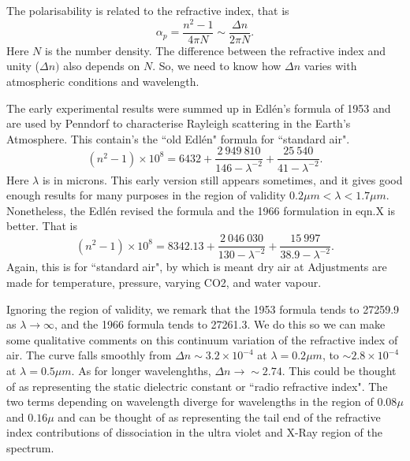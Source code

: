 \documentclass[12pt]{article}
\begin{document}
The polarisability is related to the
refractive index, that is
\begin{equation}
\alpha_p=\frac{n^2-1}{ 4 \pi N} \sim \frac{\Delta n}{2 \pi N}.
\end{equation}
Here $N$ is the number density. The difference between the refractive index and unity ($\Delta n)$ also
depends on $N$. So, we need to know how $\Delta n$ varies with atmospheric conditions and wavelength.

The early experimental results were summed up in Edl\'{e}n's formula of 1953
\cite{Edlen1:Mybib} and are used by Penndorf \cite{PenndorfAir:Mybib} to characterise Rayleigh scattering in the
Earth's Atmosphere. This contain's the ``old Edl\'{e}n" formula for ``standard air".
\begin{equation}
(n^2-1)\times 10^8=6432+\frac{2\>949\>810}{146-\lambda^{-2}}+\frac{25\>540}{41-\lambda^{-2}}.
\end{equation}
Here $\lambda$ is in microns.
This early version still appears sometimes, and it gives good enough results for many purposes
 in the region of validity $0.2 \mu m < \lambda < 1.7 \mu m$. Nonetheless, the Edl\'{e}n revised the
formula \cite{Edlen2:Mybib} and the 1966 formulation in eqn.X is better. That is
\begin{equation}
(n^2-1)\times 10^8=8342.13+\frac{2\>046\>030}{130-\lambda^{-2}}+\frac{15\>997}{38.9-\lambda^{-2}}.
\end{equation}
Again, this is for ``standard air", by which is meant dry air at
Adjustments are made for temperature, pressure, varying CO2, and water vapour.

Ignoring the region of validity, we remark that the  1953 formula tends to 27259.9
 as $\lambda \rightarrow \infty$,  and the 1966 formula tends to 27261.3. We do this so we can make some qualitative comments on
this continuum variation of the refractive index of air. The
curve falls smoothly from $\Delta n \sim 3.2 \times 10^{-4}$
 at $\lambda=0.2 \mu m$, to $\sim 2.8 \times 10^{-4}$ at $\lambda=0.5 \mu m$. As for longer wavelenghths, $\Delta n \rightarrow \sim 2.74$. This could be thought of as representing the static dielectric constant or ``radio refractive index".
The two terms depending on wavelength diverge for wavelengths in the region of $0.08 \mu$ and $0.16 \mu$ and can be thought of as 
representing the tail end of the refractive index contributions of dissociation in the ultra violet and X-Ray region of the spectrum. 





\newpage


\end{document}
